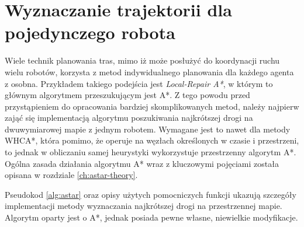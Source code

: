 \section{Wyznaczanie trajektorii dla pojedynczego robota}
\label{ch:alg-single-astar}

Wiele technik planowania tras, mimo iż może posłużyć do koordynacji ruchu wielu robotów, korzysta z metod indywidualnego planowania dla każdego agenta z osobna. Przykładem takiego podejścia jest {\it Local-Repair A*}, w którym to głównym algorytmem przeszukującym jest A*.
Z tego powodu przed przystąpieniem do opracowania bardziej skomplikowanych metod, należy najpierw zająć się implementacją algorytmu poszukiwania najkrótszej drogi na dwuwymiarowej mapie z jednym robotem. Wymagane jest to nawet dla metody WHCA*, która pomimo, że operuje na węzłach określonych w czasie i przestrzeni, to jednak w obliczaniu samej heurystyki wykorzystuje przestrzenny algorytm A*.
Ogólna zasada działania algorytmu A* wraz z kluczowymi pojęciami została opisana w rozdziale \ref{ch:astar-theory}.

Pseudokod \ref{alg:astar} oraz opisy użytych pomocniczych funkcji ukazują szczegóły implementacji metody wyznaczania najkrótszej drogi na przestrzennej mapie. Algorytm oparty jest o A*, jednak posiada pewne własne, niewielkie modyfikacje.

